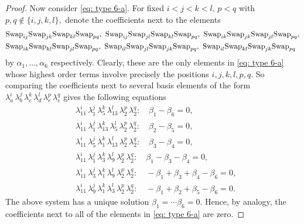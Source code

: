 \documentclass[12pt,dvipsnames,accepted=2016-08-18,a4paper,onecolumn]{quantumarticle}
\numberwithin{equation}{section}
\theoremstyle{definition}
\begin{document}
\begin{proof}
Now consider \eqref{eq: type 6-a}. For fixed $i < j < k < l,\, p<q$ with $p,q \notin \{i,j,k,l\},$ denote the coefficients next to the elements
\begin{align*}
		&\textnormal{Swap}_{ij} \textnormal{Swap}_{jk} \textnormal{Swap}_{kl}\textnormal{Swap}_{pq}, \ 
		\textnormal{Swap}_{ij} \textnormal{Swap}_{jl} \textnormal{Swap}_{kl}\textnormal{Swap}_{pq},\ 
		\textnormal{Swap}_{ik} \textnormal{Swap}_{jk} \textnormal{Swap}_{jl}\textnormal{Swap}_{pq},\\
		&\textnormal{Swap}_{ik} \textnormal{Swap}_{kl} \textnormal{Swap}_{jl}\textnormal{Swap}_{pq},\ 
		\textnormal{Swap}_{il} \textnormal{Swap}_{jl} \textnormal{Swap}_{jk}\textnormal{Swap}_{pq},\
		\textnormal{Swap}_{il} \textnormal{Swap}_{kl} \textnormal{Swap}_{jk}\textnormal{Swap}_{pq}
\end{align*}
by $\alpha_1,\ldots,\alpha_6$ respectively.
Clearly, these are the only elements in \eqref{eq: type 6-a} whose highest order terms involve precisely the positions $i,j,k,l,p,q.$
So comparing the coefficients next to several basis elements 
of the form $\lambda_a^i\, \lambda_b^j\, \lambda_c^k\, \lambda_d^l\, \lambda_e^p\, \lambda_e^q$ gives the following equations
\begin{equation}\label{eq: sys}
\begin{split}
	&\lambda_{11}^i\, \lambda_1^j\, \lambda_5^k\, \lambda_{13}^l\, \lambda_2^p\, \lambda_2^q:\quad \beta_1-\beta_6=0,\\
	&\lambda_{11}^i\,\lambda_1^j\, \lambda_{13}^k\, \lambda_5^l\, \lambda_2^p\, \lambda_2^q:\quad \beta_2 - \beta_5=0,\\
	&\lambda_{11}^i\, \lambda_5^j\, \lambda_1^k\, \lambda_{13}^l\, \lambda_2^p\, \lambda_2^q:\quad \beta_3 - \beta_4=0,\\
	&\lambda_{11}^i\, \lambda_1^j\, \lambda_3^k\, \lambda_9^l\, \lambda_2^p\, \lambda_2^q: \quad \beta_1 - \beta_3 - \beta_4=0,\\
	&\lambda_{11}^i\, \lambda_3^j\, \lambda_1^k\, \lambda_9^l\, \lambda_2^p\, \lambda_2^q: \quad -\beta_1 + \beta_3 + \beta_4 - \beta_6 =0,\\
	&\lambda_{11}^i\, \lambda_9^j\, \lambda_1^k\, \lambda_3^l\, \lambda_2^p\, \lambda_2^q:\quad -\beta_1 + \beta_2 + \beta_5 - \beta_6 =0.
\end{split}
\end{equation}
The above system has a unique solution $\beta_1= \cdots \beta_6 =0.$ Hence, by analogy, the coefficients next to all of the elements in  \eqref{eq: type 6-a} are zero.




\end{proof}
\end{document}

